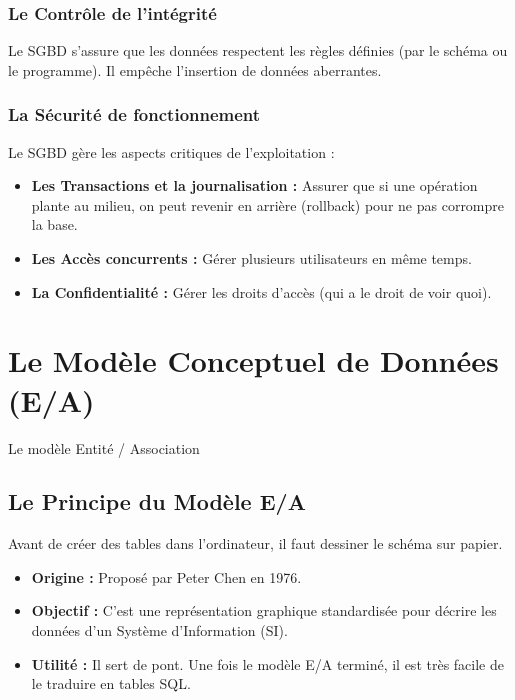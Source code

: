 \subsection{Le Contrôle de l'intégrité}
Le SGBD s'assure que les données respectent les règles définies (par le schéma ou le programme). Il empêche l'insertion de données aberrantes.

\subsection{La Sécurité de fonctionnement}
Le SGBD gère les aspects critiques de l'exploitation :

\begin{itemize}
\item \textbf{Les Transactions et la journalisation :} Assurer que si une opération plante au milieu, on peut revenir en arrière (rollback) pour ne pas corrompre la base.
\item \textbf{Les Accès concurrents :} Gérer plusieurs utilisateurs en même temps.
\item \textbf{La Confidentialité :} Gérer les droits d'accès (qui a le droit de voir quoi).
\end{itemize}


\newpage

\chapter{Le Modèle Conceptuel de Données (E/A)}

Le modèle Entité / Association

\section{Le Principe du Modèle E/A}

Avant de créer des tables dans l'ordinateur, il faut dessiner le schéma sur papier.

\begin{itemize}
\item \textbf{Origine :} Proposé par Peter Chen en 1976.
\item \textbf{Objectif :} C'est une représentation graphique standardisée pour décrire les données d'un Système d'Information (SI).
\item \textbf{Utilité :} Il sert de pont. Une fois le modèle E/A terminé, il est très facile de le traduire en tables SQL.
\end{itemize}

